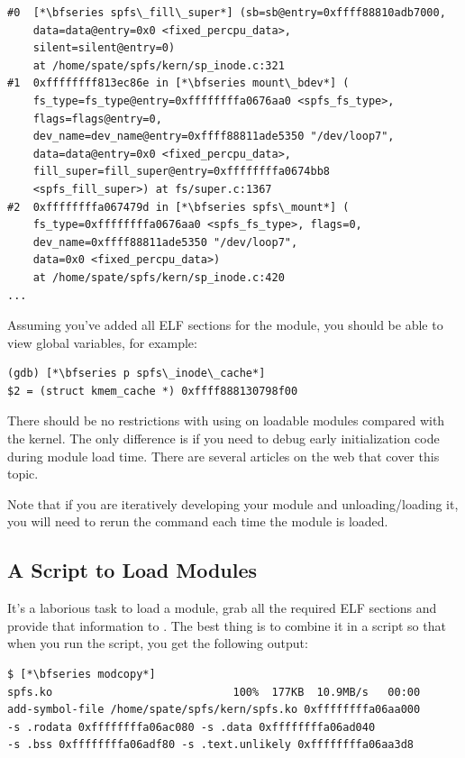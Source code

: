 \begin{lstlisting}
#0  [*\bfseries spfs\_fill\_super*] (sb=sb@entry=0xffff88810adb7000, 
    data=data@entry=0x0 <fixed_percpu_data>,
    silent=silent@entry=0)
    at /home/spate/spfs/kern/sp_inode.c:321
#1  0xffffffff813ec86e in [*\bfseries mount\_bdev*] (
    fs_type=fs_type@entry=0xffffffffa0676aa0 <spfs_fs_type>, 
    flags=flags@entry=0, 
    dev_name=dev_name@entry=0xffff88811ade5350 "/dev/loop7", 
    data=data@entry=0x0 <fixed_percpu_data>, 
    fill_super=fill_super@entry=0xffffffffa0674bb8 
    <spfs_fill_super>) at fs/super.c:1367
#2  0xffffffffa067479d in [*\bfseries spfs\_mount*] (
    fs_type=0xffffffffa0676aa0 <spfs_fs_type>, flags=0, 
    dev_name=0xffff88811ade5350 "/dev/loop7", 
    data=0x0 <fixed_percpu_data>)
    at /home/spate/spfs/kern/sp_inode.c:420
...
\end{lstlisting}

\noindent
Assuming you've added all ELF sections for the module, you should be able to view global variables, for example:

\begin{lstlisting}
(gdb) [*\bfseries p spfs\_inode\_cache*]
$2 = (struct kmem_cache *) 0xffff888130798f00
\end{lstlisting}

\noindent
There should be no restrictions with using  on loadable modules compared with the kernel. The only difference is if you need to debug early initialization code during module load time. There are several articles on the web that cover this topic.

Note that if you are iteratively developing your module and unloading/loading it, you will need to rerun the  command each time the module is loaded.

\subsection{A Script to Load Modules}

It's a laborious task to load a module, grab all the required ELF sections and provide that information to . The best thing is to combine it in a script so that when you run the script, you get the following output:

\begin{lstlisting}
$ [*\bfseries modcopy*]
spfs.ko                            100%  177KB  10.9MB/s   00:00    
add-symbol-file /home/spate/spfs/kern/spfs.ko 0xffffffffa06aa000
-s .rodata 0xffffffffa06ac080 -s .data 0xffffffffa06ad040 
-s .bss 0xffffffffa06adf80 -s .text.unlikely 0xffffffffa06aa3d8
\end{lstlisting}


